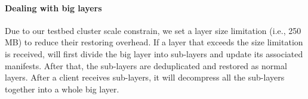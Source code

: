 \paragraph{Dealing with big layers}
Due to our testbed cluster scale constrain,
we set a layer size limitation (i.e., 250 MB) to reduce their restoring overhead.
If a layer that exceeds the size limitation is received,
\sysname will first divide the big layer into sub-layers and update its associated manifests.
After that,
the sub-layers are deduplicated and restored as normal layers.
After a client receives sub-layers,   
it will decompress all the sub-layers together into a whole big layer.
%
%
%

